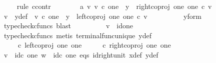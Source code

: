 \begin{isabellebody}
\ \ \ \ \isamarkupfalse%
{\isacharparenleft}{\kern0pt}rule\ ccontr{\isacharparenright}{\kern0pt}\isanewline
\ \ \ \ \ \ \isamarkupfalse%
\ a{}{\isacharcolon}{\kern0pt}\ {\isachardoublequoteopen}{\isasymnexists}v{\isachardot}{\kern0pt}\ v\ {\isasymin}\isactrlsub c\ one\ {\isasymand}\ y\ {\isacharequal}{\kern0pt}\ right{\isacharunderscore}{\kern0pt}coproj\ one\ one\ {\isasymcirc}\isactrlsub c\ v{\isachardoublequoteclose}\isanewline
\ \ \ \ \ \ \isamarkupfalse%
\ \isamarkupfalse%
\ v\ \ y{\isacharunderscore}{\kern0pt}def{\isacharcolon}{\kern0pt}\ \ {\isachardoublequoteopen}v\ {\isasymin}\isactrlsub c\ one\ {\isasymand}\ y\ {\isacharequal}{\kern0pt}\ left{\isacharunderscore}{\kern0pt}coproj\ one\ one\ {\isasymcirc}\isactrlsub c\ v{\isachardoublequoteclose}\isanewline
\ \ \ \ \ \ \ \ \isamarkupfalse%
\ y{\isacharunderscore}{\kern0pt}form\ \isamarkupfalse%
\ {\isacharparenleft}{\kern0pt}typecheck{\isacharunderscore}{\kern0pt}cfuncs{\isacharcomma}{\kern0pt}\ blast{\isacharparenright}{\kern0pt}\isanewline
\ \ \ \ \ \ \isamarkupfalse%
\ \isamarkupfalse%
\ {\isachardoublequoteopen}v\ {\isacharequal}{\kern0pt}\ id{\isacharparenleft}{\kern0pt}one{\isacharparenright}{\kern0pt}{\isachardoublequoteclose}\isanewline
\ \ \ \ \ \ \ \ \isamarkupfalse%
\ {\isacharparenleft}{\kern0pt}typecheck{\isacharunderscore}{\kern0pt}cfuncs{\isacharcomma}{\kern0pt}\ metis\ terminal{\isacharunderscore}{\kern0pt}func{\isacharunderscore}{\kern0pt}unique\ y{\isacharunderscore}{\kern0pt}def{\isacharparenright}{\kern0pt}\isanewline
\ \ \ \ \ \ \isamarkupfalse%
\ \isamarkupfalse%
\ {\isachardoublequoteopen}{\isasymlangle}{\isasymt}{\isacharcomma}{\kern0pt}\ {\isasymt}{\isasymrangle}\ {\isasymamalg}{\isasymlangle}{\isasymf}{\isacharcomma}{\kern0pt}\ {\isasymf}{\isasymrangle}\ {\isasymcirc}\isactrlsub c\ left{\isacharunderscore}{\kern0pt}coproj\ one\ one\ {\isacharequal}{\kern0pt}\ {\isasymlangle}{\isasymt}{\isacharcomma}{\kern0pt}\ {\isasymt}{\isasymrangle}\ {\isasymamalg}{\isasymlangle}{\isasymf}{\isacharcomma}{\kern0pt}\ {\isasymf}{\isasymrangle}\ {\isasymcirc}\isactrlsub c\ right{\isacharunderscore}{\kern0pt}coproj\ one\ one{\isachardoublequoteclose}\isanewline
\ \ \ \ \ \ \ \ \isamarkupfalse%
\ {\isacartoucheopen}v\ {\isacharequal}{\kern0pt}\ id\isactrlsub c\ one{\isacartoucheclose}\ {\isacartoucheopen}w\ {\isacharequal}{\kern0pt}\ id\isactrlsub c\ one{\isacartoucheclose}\ eqs\ id{\isacharunderscore}{\kern0pt}right{\isacharunderscore}{\kern0pt}unit{}\ x{\isacharunderscore}{\kern0pt}def\ y{\isacharunderscore}{\kern0pt}def\ \isamarkupfalse%

\end{isabellebody}
